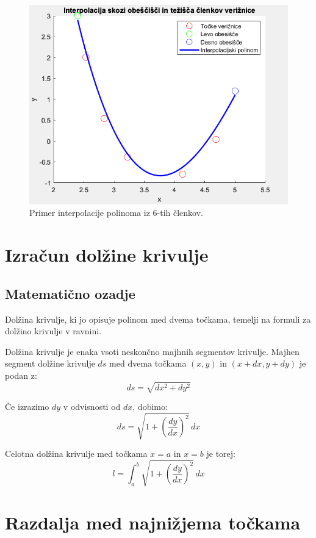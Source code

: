 \documentclass{article}
\begin{document}
        \begin{figure}[h!]
        \centering
        \includegraphics[width=0.8\linewidth]{slikaInterpolPol.png}
        \caption{Primer interpolacije polinoma iz 6-tih členkov.}
        \label{slika2:interpolacija}
        \end{figure}
        \medskip
        
        \section{Izračun dolžine krivulje}
        \subsection{Matematično ozadje}
        Dolžina krivulje, ki jo opisuje polinom med dvema točkama, temelji na formuli za dolžino krivulje v ravnini.

        Dolžina krivulje je enaka vsoti neskončno majhnih segmentov krivulje.
        Majhen segment dolžine krivulje \( ds \) med dvema točkama \( (x, y) \) in \( (x + dx, y + dy) \) je podan z:
        \[
        ds = \sqrt{dx^2 + dy^2}
        \]
        
        Če izrazimo \( dy \) v odvisnosti od \( dx \), dobimo:
        \[
        ds = \sqrt{1 + \left( \frac{dy}{dx} \right)^2} \, dx
        \]
        
        Celotna dolžina krivulje med točkama \( x = a \) in \( x = b \) je torej:
        \[
        l = \int_a^b \sqrt{1 + \left( \frac{dy}{dx} \right)^2} \, dx
        \]

    \section{Razdalja med najnižjema točkama}
\end{document}
